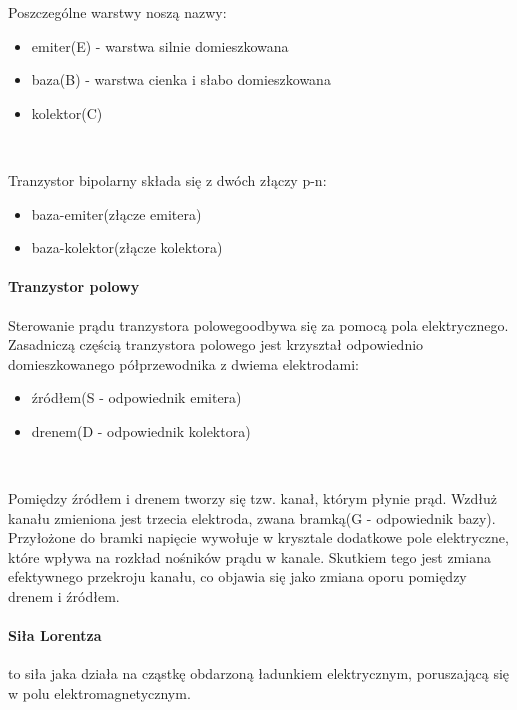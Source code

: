 \documentclass{article}
\begin{document}
            Poszczególne warstwy noszą nazwy:
            \begin{itemize}
                \item emiter(E) - warstwa silnie domieszkowana
                \item baza(B) - warstwa cienka i słabo domieszkowana
                \item kolektor(C)
            \end{itemize}

            \

            Tranzystor bipolarny składa się z dwóch złączy p-n:
            \begin{itemize}
                \item baza-emiter(złącze emitera)
                \item baza-kolektor(złącze kolektora)
            \end{itemize}

            \paragraph{Tranzystor polowy}
            Sterowanie prądu tranzystora polowegoodbywa się za pomocą pola
            elektrycznego. Zasadniczą częścią tranzystora polowego jest krzyształ
            odpowiednio domieszkowanego półprzewodnika z dwiema elektrodami:
            \begin{itemize}
                \item źródłem(S - odpowiednik emitera)
                \item drenem(D - odpowiednik kolektora)
            \end{itemize}

            \
            
            Pomiędzy źródłem i drenem tworzy się tzw. kanał, którym płynie prąd.
            Wzdłuż kanału zmieniona jest trzecia elektroda, zwana bramką(G - odpowiednik bazy).
            Przyłożone do bramki napięcie wywołuje w krysztale dodatkowe pole elektryczne,
            które wpływa na rozkład nośników prądu w kanale. Skutkiem tego jest zmiana
            efektywnego przekroju kanału, co objawia się jako zmiana oporu pomiędzy drenem i źródłem.


            \paragraph{Siła Lorentza} to siła jaka działa na cząstkę obdarzoną ładunkiem
            elektrycznym, poruszającą się w polu elektromagnetycznym.
            
\end{document}
